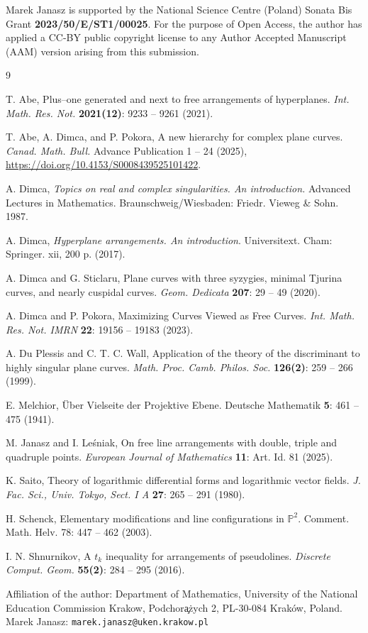 \documentclass[11pt]{article}
\theoremstyle{plain}
\theoremstyle{definition}
\theoremstyle{remark}
\newcommand{\PP}{\mathbb{P}}
\begin{document}
 Marek Janasz is supported by the National 
 Science Centre (Poland) Sonata Bis Grant  
 \textbf{2023/50/E/ST1/00025}. For the 
 purpose of Open Access, the author has 
 applied a CC-BY public copyright license 
 to any Author Accepted Manuscript (AAM) 
 version arising from this submission.
\begin{thebibliography}{9}

  T. Abe, Plus--one generated and next to free arrangements of hyperplanes. \textit{Int. Math. Res. Not.} \textbf{2021(12)}: 9233 -- 9261 (2021).

T. Abe, A. Dimca, and P. Pokora, A new hierarchy for complex plane curves. \textit{Canad. Math. Bull.} Advance Publication 1 -- 24 (2025), \url{https://doi.org/10.4153/S0008439525101422}.

A. Dimca,  \textit{Topics on real and complex singularities. An introduction.} Advanced Lectures in Mathematics. Braunschweig/Wiesbaden: Friedr. Vieweg \& Sohn. 1987.

A. Dimca,  \textit{Hyperplane arrangements. An introduction}. Universitext. Cham: Springer. xii, 200 p. (2017).

A. Dimca and G. Sticlaru, Plane curves with three syzygies, minimal Tjurina curves, and nearly cuspidal curves. \textit{Geom. Dedicata}  {\bf 207}:  29 -- 49 (2020).

A. Dimca and P. Pokora, Maximizing Curves Viewed as Free Curves. \textit{Int. Math. Res. Not. IMRN} \textbf{22}:  19156 -- 19183 (2023).

A. Du Plessis and C. T. C. Wall, Application of the theory of the discriminant to highly singular plane curves. \textit{Math. Proc. Camb. Philos. Soc.} \textbf{126(2)}: 259 -- 266 (1999).

  E. Melchior, \"{U}ber Vielseite der Projektive Ebene. Deutsche Mathematik {\bf 5}: 461 – 475 (1941).

M. Janasz and I. Leśniak, On free line arrangements with double, triple and quadruple points. \textit{European Journal of Mathematics} \textbf{11}: Art. Id. 81 (2025).

K. Saito, Theory of logarithmic differential forms and logarithmic vector fields. \textit{J. Fac. Sci., Univ. Tokyo, Sect. I A} \textbf{27}: 265 -- 291 (1980).

 H. Schenck, Elementary modifications and line configurations in $\PP^2$. Comment. Math. Helv. 78: 447 -- 462 (2003). 

I. N. Shnurnikov, A $t_{k}$ inequality for arrangements of pseudolines. \textit{Discrete Comput. Geom.} \textbf{55(2)}: 284 -- 295 (2016).
\end{thebibliography}
\bigskip
Affiliation of the author:
\noindent
Department of Mathematics,
University of the National Education Commission Krakow,
Podchor\c a\.zych 2,
PL-30-084 Krak\'ow, Poland. \\
\nopagebreak
\noindent
Marek Janasz: \texttt{marek.janasz@uken.krakow.pl} 
\end{document}
